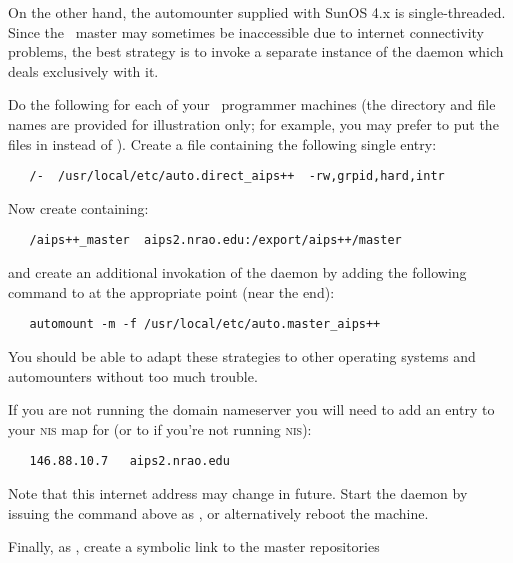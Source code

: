 On the other hand, the automounter supplied with SunOS 4.x is single-threaded.
Since the \aipspp\ master may sometimes be inaccessible due to internet
connectivity problems, the best strategy is to invoke a separate instance of
the  daemon which deals exclusively with it.

Do the following for each of your \aipspp\ programmer machines (the directory
and file names are provided for illustration only; for example, you may prefer
to put the files in  instead of ).  Create a
file  containing the following single
entry:

\begin{verbatim}
   /-  /usr/local/etc/auto.direct_aips++  -rw,grpid,hard,intr
\end{verbatim}

\noindent
Now create  containing:

\begin{verbatim}
   /aips++_master  aips2.nrao.edu:/export/aips++/master
\end{verbatim}

\noindent
and create an additional invokation of the  daemon by
adding the following command to  at the appropriate point
(near the end):

\begin{verbatim}
   automount -m -f /usr/local/etc/auto.master_aips++
\end{verbatim}

You should be able to adapt these strategies to other operating systems and
automounters without too much trouble.

\noindent
If you are not running the domain nameserver you will need to add an entry to
your \textsc{nis}  map for  (or to
 if you're not running \textsc{nis}):

\begin{verbatim}
   146.88.10.7   aips2.nrao.edu
\end{verbatim}

\noindent
Note that this internet address may change in future.  Start the
 daemon by issuing the  command above as
, or alternatively reboot the machine.

Finally, as , create a symbolic link to the master repositories

